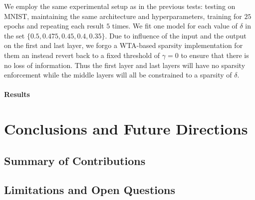\documentclass[a4paper,12pt]{report}
\begin{document}
We employ the same experimental setup as in the previous tests: testing on MNIST, maintaining 
the same architecture and hyperparameters, training for $25$ epochs and repeating each 
result $5$ times. We fit one model for each value of $\delta$ in the set 
$\{0.5, 0.475, 0.45, 0.4, 0.35\}$. Due to influence of the input and the output on 
the first and last layer, we forgo a WTA-based sparsity implementation for them an 
instead revert back to a fixed threshold of $\gamma = 0$ to ensure that there is no 
loss of information. Thus the first layer and last layers will have no sparsity 
enforcement while the middle layers will all be constrained to a sparsity of $\delta$.
\subsubsection*{Results}

\chapter{Conclusions and Future Directions}
\section{Summary of Contributions}
\section{Limitations and Open Questions}




\appendix
\end{document}
